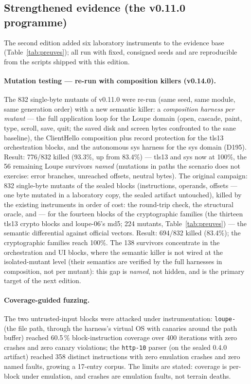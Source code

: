 \documentclass[11pt,a4paper]{article}
\newcommand{\code}[1]{\texttt{\small #1}}
\begin{document}
\subsection{Strengthened evidence (the v0.11.0 programme)}\label{sec:renforce}

The second edition added six laboratory instruments to the evidence base
(Table~\ref{tab:preuves}); all run with fixed, consigned seeds and are
reproducible from the scripts shipped with this edition.

\paragraph{Mutation testing --- re-run with composition killers (v0.14.0).} The 832
single-byte mutants of v0.11.0 were re-run (same seed, same module,
same generation order) with a new semantic killer: a \emph{composition
harness per mutant} --- the full application loop for the Loupe domain
(open, cascade, paint, type, scroll, save, quit; the saved disk and
screen bytes confronted to the sane baseline), the ClientHello composition
plus record protection for the tls13 orchestration blocks, and the
autonomous sys harness for the sys domain (D195). Result: 776/832
killed (93.3\%, up from 83.4\%) --- tls13 and sys now at 100\%, the
56 remaining Loupe survivors \emph{named} (mutations in paths the
scenario does not exercise: error branches, unreached offsets,
neutral bytes). The original campaign: 832 single-byte mutants of the sealed blocks
(instructions, operands, offsets --- one byte mutated in a laboratory copy,
the sealed artifact untouched), killed by the existing instruments in
order of cost: the round-trip check, the structural oracle, and --- for the fourteen
blocks of the cryptographic families (the thirteen tls13 crypto blocks
and loupe-06's md5; 224 mutants, Table~\ref{tab:preuves}) --- the
semantic differential against official vectors. Result: 694/832 killed (83.4\%);
the cryptographic families reach 100\%. The 138 survivors concentrate in
the orchestration and UI blocks, where the semantic killer is not wired
at the isolated-mutant level (their semantics are verified by the full
harnesses in composition, not per mutant): this gap is \emph{named}, not
hidden, and is the primary target of the next edition.

\paragraph{Coverage-guided fuzzing.} The two untrusted-input blocks were
attacked under instrumentation: \code{loupe-} (the file path, through
the harness's virtual OS with canaries around the path buffer) reached
60.5\,\% block-instruction coverage over 400 iterations with zero crashes
and zero canary violations; the \code{http-10} parser (on the sealed 0.4.0
artifact) reached 358 distinct instructions with zero emulation crashes
and zero named faults, growing a 17-entry corpus. The limits are stated:
coverage is per-block under emulation, and crashes are emulation faults,
not terrain deaths.
\end{document}
